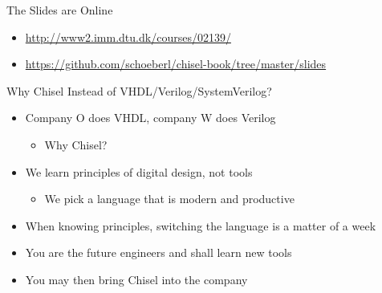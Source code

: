 \documentclass[xcolor=pdflatex,dvipsnames,table]{beamer}
\begin{document}
\begin{frame}[fragile]{The Slides are Online}
\begin{itemize}
\item \url{http://www2.imm.dtu.dk/courses/02139/}
\item \url{https://github.com/schoeberl/chisel-book/tree/master/slides}
\end{itemize}
\end{frame}

\begin{frame}[fragile]{Why Chisel Instead of VHDL/Verilog/SystemVerilog?}
\begin{itemize}
\item Company O does VHDL, company W does Verilog
\begin{itemize}
\item Why Chisel?
\end{itemize}
\item We learn principles of digital design, not tools
\begin{itemize}
\item We pick a language that is modern and productive
\end{itemize}
\item When knowing principles, switching the language is a matter of a week
\item You are the future engineers and shall learn new tools
\item You may then bring Chisel into the company
\end{itemize}
\end{frame}
\end{document}
